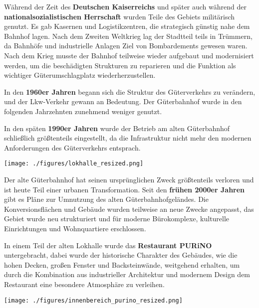 \documentclass[landscape, a4paper]{article}
\newcommand\alert[1]{\textcolor{PrimaryColor}{\textbf{#1}}}
\begin{document}
\begin{minipage}[t]{0.31\textwidth}
	Während der Zeit des \alert{Deutschen Kaiserreichs} und später auch während der \alert{nationalsozialistischen Herrschaft} wurden Teile des Gebiets militärisch genutzt. Es gab Kasernen und Logistikzentren, die strategisch günstig nahe dem Bahnhof lagen. Nach dem Zweiten Weltkrieg lag der Stadtteil teils in Trümmern, da Bahnhöfe und industrielle Anlagen Ziel von Bombardements gewesen waren. Nach dem Krieg musste der Bahnhof teilweise wieder aufgebaut und modernisiert werden, um die beschädigten Strukturen zu reparieren und die Funktion als wichtiger Güterumschlagplatz wiederherzustellen.

In den \alert{1960er Jahren} begann sich die Struktur des Güterverkehrs zu verändern, und der Lkw-Verkehr gewann an Bedeutung. Der Güterbahnhof wurde in den folgenden Jahrzehnten zunehmend weniger genutzt.
\end{minipage}%
\hfill\color{white}%
\vrule width 0.01cm
\hfill\color{black}%
\begin{minipage}[t]{0.31\textwidth}
	\vspace{0cm}
	\setlength{\parskip}{0.25cm}
	In den späten \alert{1990er Jahren} wurde der Betrieb am alten Güterbahnhof schließlich größtenteils eingestellt, da die Infrastruktur nicht mehr den modernen Anforderungen des Güterverkehrs entsprach.

	\texttt{[image: ./figures/lokhalle\_resized.png]}
	\setlength{\parskip}{0.25cm}

	Der alte Güterbahnhof hat seinen ursprünglichen Zweck größtenteils verloren und ist heute Teil einer urbanen Transformation. Seit den \alert{frühen 2000er Jahren} gibt es Pläne zur Umnutzung des alten Güterbahnhofgeländes. Die Konversionsflächen und Gebäude wurden teilweise an neue Zwecke angepasst, das Gebiet wurde neu strukturiert und für moderne Bürokomplexe, kulturelle Einrichtungen und Wohnquartiere erschlossen. %

  In einem Teil der alten Lokhalle wurde das \alert{Restaurant PURiNO} untergebracht, dabei wurde der historische Charakter des Gebäudes, wie die hohen Decken, großen Fenster und Backsteinwände, weitgehend erhalten, um durch die Kombination aus industrieller Architektur und modernem Design dem Restaurant eine besondere Atmosphäre zu verleihen.

	\texttt{[image: ./figures/innenbereich\_purino\_resized.png]}
	\setlength{\parskip}{0.25cm}
\end{minipage}%
\end{document}
